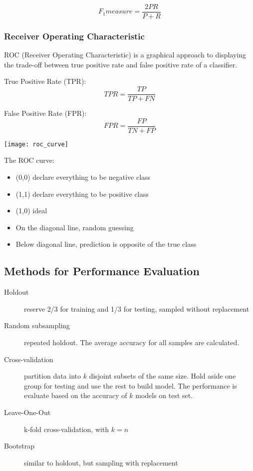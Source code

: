 \begin{multicols*}{2}
$$F_1measure=\frac{2PR}{P+R}$$

\subsubsection{Receiver Operating Characteristic}

\noindent ROC (Receiver Operating Characteristic) is a graphical approach to displaying the trade-off between true positive rate and false positive rate of a classifier.

\noindent True Positive Rate (TPR):
$$TPR = \frac{TP}{TP+FN}$$

\noindent False Positive Rate (FPR):
$$FPR = \frac{FP}{TN + FP}$$

\begin{center}
\texttt{[image: roc\_curve]}
\end{center}

\noindent The ROC curve:

\begin{itemize}
    \item (0,0) declare everything to be negative class
    \item (1,1) declare everything to be positive class
    \item (1,0) ideal
    \item On the diagonal line, random guessing
    \item Below diagonal line, prediction is opposite of the true class
\end{itemize}

\subsection{Methods for Performance Evaluation}

\begin{description}
    \item[Holdout] reserve 2/3 for training and 1/3 for testing, sampled without replacement
    \item[Random subsampling] repeated holdout. The average accuracy for all samples are calculated. 
    \item[Cross-validation] partition data into $k$ disjoint subsets of the same size. Hold aside one group for testing and use the rest to build model. The performance is evaluate based on the accuracy of $k$ models on test set. 
    \item[Leave-One-Out] k-fold cross-validation, with $k=n$
    \item[Bootstrap] similar to holdout, but sampling with replacement
\end{description}

\end{multicols*}